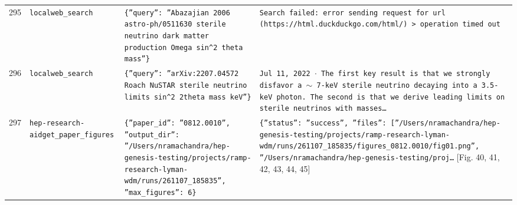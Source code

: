 \documentclass[11pt,a4paper]{article}
\begin{document}
\begin{longtable}{@{}p{}p{}p{}p{}@{}}
295 & \texttt{local}\newline\texttt{web\_\allowbreak{}search} & \texttt{\{''query'':\allowbreak{} ''Abazajian 2006 astro-ph/\allowbreak{}0511630 sterile neutrino dark matter production Omega sin\textasciicircum{}\allowbreak{}2 theta mass''\}\allowbreak{}} & \texttt{Search failed:\allowbreak{} error sending request for url (https:\allowbreak{}/\allowbreak{}/\allowbreak{}html.duckduckgo.com/\allowbreak{}html/\allowbreak{})\allowbreak{} \textgreater{}\allowbreak{} operation timed out} \\
296 & \texttt{local}\newline\texttt{web\_\allowbreak{}search} & \texttt{\{''query'':\allowbreak{} ''arXiv:\allowbreak{}2207.04572 Roach NuSTAR sterile neutrino limits sin\textasciicircum{}\allowbreak{}2 2theta mass keV''\}\allowbreak{}} & \texttt{Jul 11,\allowbreak{} 2022 $\cdot$ The first key result is that we strongly disfavor a $\sim$ 7-keV sterile neutrino decaying into a 3.5-keV photon. The second is that we derive leading limits on sterile neutrinos with masses\ldots{}\allowbreak{}} \\
297 & \texttt{hep-research-aid}\newline\texttt{get\_\allowbreak{}paper\_\allowbreak{}figures} & \texttt{\{''paper\_\allowbreak{}id'':\allowbreak{} ''0812.0010'',\allowbreak{} ''output\_\allowbreak{}dir'':\allowbreak{} ''/\allowbreak{}Users/\allowbreak{}nramachandra/\allowbreak{}hep-genesis-testing/\allowbreak{}projects/\allowbreak{}ramp-research-lyman-wdm/\allowbreak{}runs/\allowbreak{}261107\_\allowbreak{}185835'',\allowbreak{} ''max\_\allowbreak{}figures'':\allowbreak{} 6\}\allowbreak{}} & \texttt{\{''status'':\allowbreak{} ''success'',\allowbreak{} ''files'':\allowbreak{} [''/\allowbreak{}Users/\allowbreak{}nramachandra/\allowbreak{}hep-genesis-testing/\allowbreak{}projects/\allowbreak{}ramp-research-lyman-wdm/\allowbreak{}runs/\allowbreak{}261107\_\allowbreak{}185835/\allowbreak{}figures\_\allowbreak{}0812.0010/\allowbreak{}fig01.png'',\allowbreak{} ''/\allowbreak{}Users/\allowbreak{}nramachandra/\allowbreak{}hep-genesis-testing/\allowbreak{}proj\ldots{}\allowbreak{}} [Fig. 40, 41, 42, 43, 44, 45] \\

\end{longtable}
\end{document}

